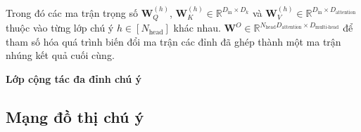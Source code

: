 Trong đó các ma trận trọng số $\mathbf{W}_Q^{(h)}$, $\mathbf{W}_K^{(h)} \in \mathbb{R}^{D_{\text{in}} \times D_{k}}$ và $\mathbf{W}_V^{(h)} \in \mathbb{R}^{D_{\text{in}} \times D_{\text{attention}}}$ thuộc vào từng lớp chú ý $h \in [N_{\text{head}}]$ khác nhau. $\mathbf{W}^{O} \in \mathbb{R}^{N_{\text{head}} D_{\text{attention}} \times D_{\text{multi-head}}}$ để tham số hóa quá trình biến đổi ma trận các đỉnh đã ghép thành một ma trận nhúng kết quả cuối cùng.

\textbf{Lớp cộng tác đa đỉnh chú ý}

\cite{weng2018attention}

\subsection{Mạng đồ thị chú ý}
\label{sec:GAT}
